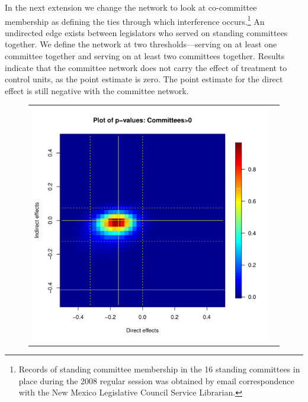 \documentclass[12pt]{article}
\begin{document}
In the next extension we change the network to look at co-committee membership as defining the ties through which interference occurs.\footnote{Records of standing committee membership in the 16 standing committees in place during the 2008 regular session was obtained by email correspondence with the New Mexico Legislative Council Service Librarian.}  An undirected edge exists between legislators who served on standing committees together.  We define the network at two thresholds---serving on at least one committee together and serving on at least two committees together. Results indicate that the committee network does not carry the effect of treatment to control units, as the point estimate is zero. The point estimate for the direct effect is still negative with the committee network.

\begin{figure}
	\centering
	\begin{tabular}{cc}
	\includegraphics[scale=0.45]{./images/pval_plot_coppock_committee_1ormore.pdf} &

\end{tabular}
\end{figure}
\end{document}
